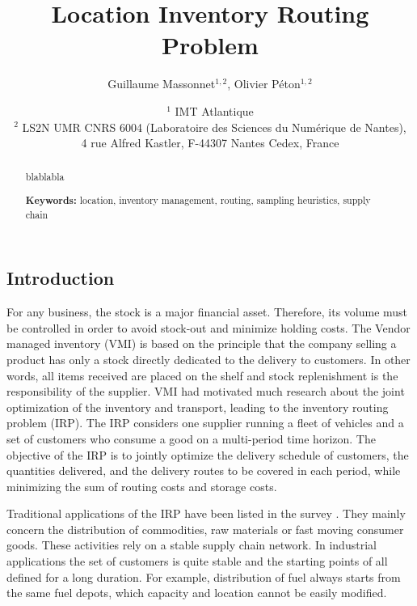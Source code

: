 \documentclass[a4paper,10pt]{article}
\title{Location Inventory Routing Problem}
\author{Guillaume Massonnet$^{1,2}$, Olivier P\'eton$^{1,2}$}
\date{$^1$ IMT Atlantique\\ 
	$^2$ LS2N UMR CNRS 6004 (Laboratoire des Sciences du Numérique de Nantes), \\ 4 rue Alfred Kastler, F-44307 Nantes Cedex, France}
\begin{document}
	
\maketitle

	
\begin{abstract}
	blablabla
	
	
\textbf{Keywords:}		location, inventory management, routing, sampling heuristics, supply chain
	
\end{abstract}





\modulolinenumbers[5]
\linenumbers
\begin{linenumbers}


\section{Introduction}

For any business, the stock is a major financial asset. 
Therefore, its volume must be controlled in order to avoid stock-out and minimize holding costs. 
The Vendor managed inventory (VMI) is based on the principle that the company selling a product has only a stock directly dedicated to the delivery to customers. In other words, all items received are placed on the shelf and stock replenishment is the responsibility of the supplier. VMI had motivated much research about the joint optimization of the inventory and transport, leading to the inventory routing problem (IRP). The IRP considers one supplier running a fleet of vehicles and a set of customers who consume a good on a multi-period time horizon. The objective of the IRP is to jointly optimize the delivery schedule of customers, the quantities delivered, and the delivery routes to be covered in each period, while minimizing the sum of routing costs and storage costs.

Traditional applications of the IRP have been listed in the survey \cite{Coelho2014}. They mainly concern the distribution of commodities, raw materials or fast moving consumer goods. These activities rely on a stable supply chain network. 
In industrial applications the set of customers is quite stable and the starting points of all defined for a long duration.
For example, distribution of fuel always starts from the same fuel depots, which capacity and location cannot be easily modified. 


\end{linenumbers}
\end{document}
